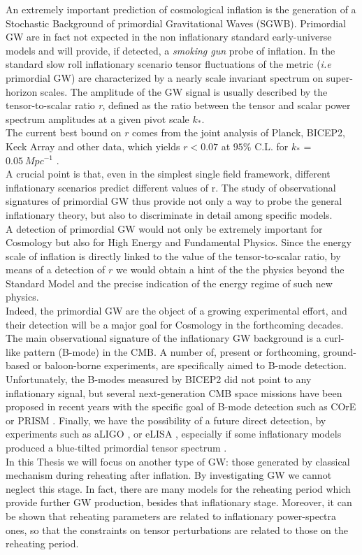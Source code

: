 \documentclass[11pt,a4paper,twoside]{book}
\begin{document}
An extremely important prediction of cosmological inflation is the generation of a Stochastic Background of primordial Gravitational Waves (SGWB). Primordial GW are in fact not expected in the non inflationary standard early-universe models and will provide, if detected, a \textit{smoking gun} probe of inflation. In the standard slow roll inflationary scenario tensor fluctuations of the metric (\textit{i.e} primordial GW) are characterized by a nearly scale invariant spectrum on super-horizon scales. The amplitude of the GW signal is usually described by the tensor-to-scalar ratio \textit{r}, defined as the ratio between the tensor and scalar power spectrum amplitudes at a given pivot scale $ k_{*} $.\\
The current best bound on $ \textit{r} $ comes from the joint analysis of Planck, BICEP2, Keck Array and other data, which yields $ r < 0.07 $ at $ 95 \% $ C.L. for $ k_{*}$ = $ 0.05\ Mpc^{-1} $ \cite{Bicep2:Intro}. \\
A crucial point is that, even in the simplest single field framework, different inflationary scenarios predict different values of r. The study of observational signatures of primordial GW thus provide not only a way to probe the general inflationary theory, but also to discriminate in detail among specific models.\\
A detection of primordial GW would not only be extremely important for Cosmology but also for High Energy and Fundamental Physics. Since the energy scale of inflation is directly linked to the value of the tensor-to-scalar ratio, by means of a detection of $ r $ we would obtain a hint of the the physics beyond the Standard Model and the precise indication of the energy regime of such new physics.\\
Indeed, the primordial GW are the object of a growing experimental effort, and their detection will be a major goal for Cosmology in the forthcoming  decades. \\
The main observational signature of the inflationary GW background is a curl-like pattern (B-mode) in the CMB. A number of, present or forthcoming, ground-based or baloon-borne experiments, are specifically aimed to B-mode detection. Unfortunately, the B-modes measured by BICEP2 \cite{Bicep2BMode:Intro} did not point to any inflationary signal, but several next-generation CMB space missions have been proposed in recent years with the specific goal of B-mode detection such as COrE \cite{COre:intro} or PRISM \cite{PRISM:intro}. 
Finally, we have the possibility of a future direct detection, by experiments such as aLIGO \cite{LIGO:intro}, or eLISA \cite{Lisa:Intro}, especially if some inflationary models produced a blue-tilted primordial tensor spectrum \cite{GWFromInflation:Intro}.\\
In this Thesis we will focus on another type of GW: those generated by classical mechanism during reheating after inflation. By investigating  GW we cannot neglect this stage. In fact, there are many models for the reheating period which provide further GW production, besides that inflationary stage. Moreover, it can be shown that reheating parameters are related to inflationary power-spectra ones, so that the constraints on tensor perturbations are related to those on the reheating period.
\end{document}
